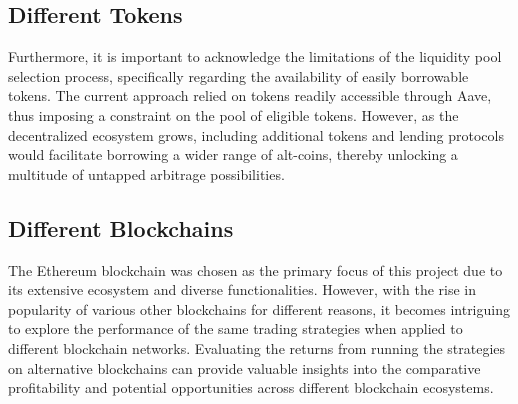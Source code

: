 \subsection{Different Tokens}
Furthermore, it is important to acknowledge the limitations of the liquidity pool selection process, specifically regarding the availability of easily borrowable tokens. The current approach relied on tokens readily accessible through Aave, thus imposing a constraint on the pool of eligible tokens. However, as the decentralized ecosystem grows, including additional tokens and lending protocols would facilitate borrowing a wider range of alt-coins, thereby unlocking a multitude of untapped arbitrage possibilities.

\subsection{Different Blockchains}
The Ethereum blockchain was chosen as the primary focus of this project due to its extensive ecosystem and diverse functionalities. However, with the rise in popularity of various other blockchains for different reasons, it becomes intriguing to explore the performance of the same trading strategies when applied to different blockchain networks. Evaluating the returns from running the strategies on alternative blockchains can provide valuable insights into the comparative profitability and potential opportunities across different blockchain ecosystems.
